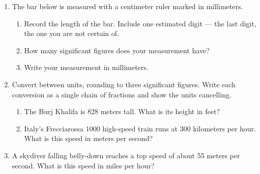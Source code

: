 \documentclass[12pt, twoside]{article}
\begin{document}
\begin{enumerate}[itemsep=0.8cm]
\newpage

\item The bar below is measured with a centimeter ruler marked in millimeters.

\begin{center}
\end{center}

  \begin{enumerate}[itemsep=1.0cm]
    \item Record the length of the bar. Include one estimated digit --- the last
      digit, the one you are not certain of.
    \item How many significant figures does your measurement have?
    \item Write your measurement in millimeters.
  \end{enumerate} \vspace{1.0cm}

\item Convert between units, rounding to three significant figures. Write each
  conversion as a single chain of fractions and show the units cancelling.
  \begin{enumerate}[itemsep=2.6cm]
    \item The Burj Khalifa is 828 meters tall. What is its height in feet?
    \item Italy's Frecciarossa 1000 high-speed train runs at 300 kilometers per hour.
      What is this speed in meters per second?
  \end{enumerate} \vspace{2.4cm}

\item A skydiver falling belly-down reaches a top speed of about 55 meters per
  second. What is this speed in miles per hour?

\end{enumerate}
\end{document}
